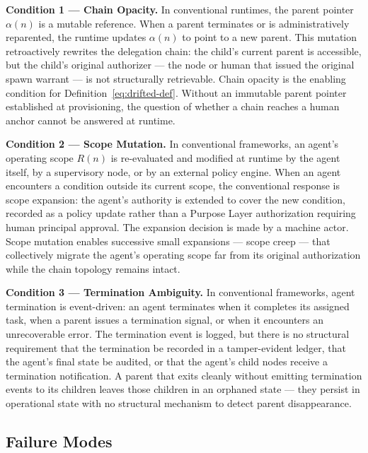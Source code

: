 \medskip
\noindent\textbf{Condition 1 — Chain Opacity.}
In conventional runtimes, the parent pointer $\alpha(n)$ is a mutable reference. When a parent terminates or is administratively reparented, the runtime updates $\alpha(n)$ to point to a new parent. This mutation retroactively rewrites the delegation chain: the child's current parent is accessible, but the child's original authorizer — the node or human that issued the original spawn warrant — is not structurally retrievable. Chain opacity is the enabling condition for Definition~\ref{eq:drifted-def}. Without an immutable parent pointer established at provisioning, the question of whether a chain reaches a human anchor cannot be answered at runtime.

\medskip
\noindent\textbf{Condition 2 — Scope Mutation.}
In conventional frameworks, an agent's operating scope $R(n)$ is re-evaluated and modified at runtime by the agent itself, by a supervisory node, or by an external policy engine. When an agent encounters a condition outside its current scope, the conventional response is scope expansion: the agent's authority is extended to cover the new condition, recorded as a policy update rather than a Purpose Layer authorization requiring human principal approval. The expansion decision is made by a machine actor. Scope mutation enables successive small expansions — scope creep — that collectively migrate the agent's operating scope far from its original authorization while the chain topology remains intact.

\medskip
\noindent\textbf{Condition 3 — Termination Ambiguity.}
In conventional frameworks, agent termination is event-driven: an agent terminates when it completes its assigned task, when a parent issues a termination signal, or when it encounters an unrecoverable error. The termination event is logged, but there is no structural requirement that the termination be recorded in a tamper-evident ledger, that the agent's final state be audited, or that the agent's child nodes receive a termination notification. A parent that exits cleanly without emitting termination events to its children leaves those children in an orphaned state — they persist in operational state with no structural mechanism to detect parent disappearance.

\subsection{Failure Modes}
\label{sec:drift-failure-modes}

